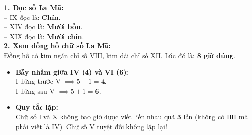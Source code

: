 \documentclass[11pt,a4paper]{article}
\begin{document}
\vspace{-2.5mm}
\noindent
\begin{minipage}[t]{0.49\textwidth}\vspace{0pt}
\begin{tcolorbox}[
  enhanced,
  colback=green!4!white,
  colframe=green!60!black,
  arc=2mm, boxrule=0.8pt,
  left=2mm, right=2mm, top=1.8mm, bottom=1.8mm,
  title={\footnotesize\bfseries\color{white}\faCheckCircle\ Ví dụ thực hành chuẩn mực}
]
{\footnotesize
\textbf{1. Đọc số La Mã:}\\
-- $\text{IX}$ đọc là: \textbf{Chín}.\\
-- $\text{XIV}$ đọc là: \textbf{Mười bốn}.\\
-- $\text{XIX}$ đọc là: \textbf{Mười chín}.\\
\textbf{2. Xem đồng hồ chữ số La Mã:}\\
Đồng hồ có kim ngắn chỉ số $\text{VIII}$, kim dài chỉ số $\text{XII}$. Lúc đó là: \textbf{8 giờ đúng}.
}
\end{tcolorbox}
\end{minipage}
\hfill
\begin{minipage}[t]{0.49\textwidth}\vspace{0pt}
\begin{tcolorbox}[
  enhanced,
  colback=red!4!white,
  colframe=red!70!black,
  arc=2mm, boxrule=0.8pt,
  left=2mm, right=2mm, top=1.8mm, bottom=1.8mm,
  title={\footnotesize\bfseries\color{white}\faExclamationTriangle\ Mẹo tránh bẫy trắc nghiệm}
]
{\footnotesize
\begin{itemize}\setlength{\itemsep}{1.5pt}\setlength{\leftskip}{-2.5mm}
  \item \textbf{Bẫy nhầm giữa IV (4) và VI (6):}\\
  $\text{I}$ đứng trước $\text{V}$ $\implies 5 - 1 = \mathbf{4}$.\\
  $\text{I}$ đứng sau $\text{V}$ $\implies 5 + 1 = \mathbf{6}$.
  \item \textbf{Quy tắc lặp:}\\
  Chữ số $\text{I}$ và $\text{X}$ không bao giờ được viết liền nhau quá $\mathbf{3}$ lần (không có $\text{IIII}$ mà phải viết là $\text{IV}$). Chữ số $\text{V}$ tuyệt đối không lặp lại!
\end{itemize}
}
\end{tcolorbox}
\end{minipage}
\end{document}

